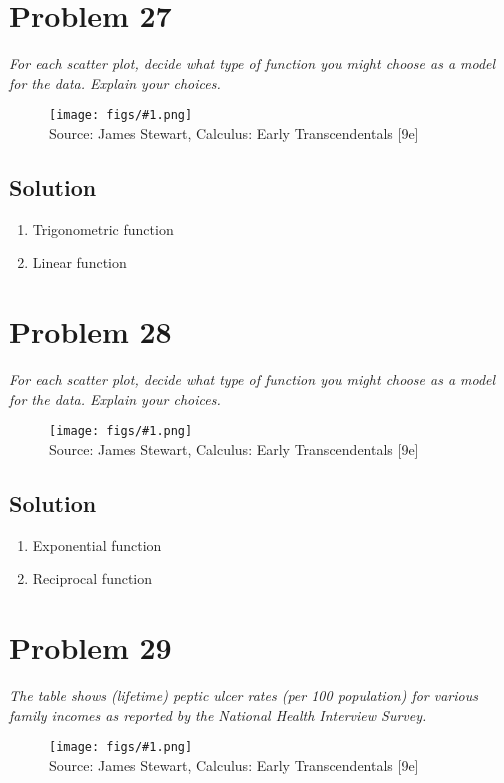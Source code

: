 \documentclass[11pt]{article}
\newcommand{\soln}{\subsection*}
\newcommand{\qn}{\textit}
\newcommand{\imagesource}[1]{{\footnotesize Source: #1}}
\newcommand{\imgqn}[1]{
	\begin{figure}[H]
		\centering
		\texttt{[image: figs/\#1.png]}\\
		\imagesource{James Stewart, Calculus: Early Transcendentals [9e]}
	\end{figure}
}
\begin{document}
\section*{Problem 27}

\qn{For each scatter plot, decide what type of function you might choose as a model for the data. Explain your choices.}

\imgqn{1.2.27}

\soln{Solution}
\begin{enumerate}
	\item Trigonometric function
	\item Linear function
\end{enumerate}

\section*{Problem 28}

\qn{For each scatter plot, decide what type of function you might choose as a model for the data. Explain your choices.}

\imgqn{1.2.28}

\soln{Solution}
\begin{enumerate}
	\item Exponential function
	\item Reciprocal function
\end{enumerate}

\section*{Problem 29}

\qn{The table shows (lifetime) peptic ulcer rates (per 100 population) for various family incomes as reported by the National Health Interview Survey.}

\imgqn{1.2.29}
\end{document}
